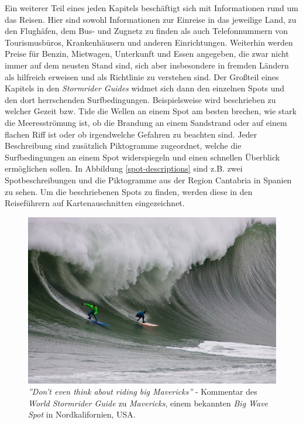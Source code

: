 Ein weiterer Teil eines jeden Kapitels beschäftigt sich mit
Informationen rund um das Reisen. Hier sind sowohl Informationen zur
Einreise in das jeweilige Land, zu den Flughäfen, dem Bus- und Zugnetz
zu finden als auch Telefonnummern von Tourismusbüros, Krankenhäusern
und anderen Einrichtungen. Weiterhin werden Preise für Benzin,
Mietwagen, Unterkunft und Essen angegeben, die zwar nicht immer auf
dem neusten Stand sind, sich aber insbesondere in fremden Ländern als
hilfreich erweisen und als Richtlinie zu verstehen sind. Der Großteil
eines Kapitels in den \textit{Stormrider Guides} widmet sich dann den
einzelnen Spots und den dort herrschenden
Surfbedingungen. Beispielsweise wird beschrieben zu welcher Gezeit
bzw. Tide die Wellen an einem Spot am besten brechen, wie stark die
Meeresströmung ist, ob die Brandung an einem Sandstrand oder auf einem
flachen Riff ist oder ob irgendwelche Gefahren zu beachten sind. Jeder
Beschreibung sind zusätzlich Piktogramme zugeordnet, welche die
Surfbedingungen an einem Spot widerspiegeln und einen schnellen
Überblick ermöglichen sollen. In Abbildung \ref{spot-descriptions}
sind z.B. zwei Spotbeschreibungen und die Piktogramme aus der Region
Cantabria in Spanien zu sehen. Um die beschriebenen Spots zu finden,
werden diese in den Reiseführern auf Kartenauschnitten eingezeichnet.

\begin{figure}[h]
  \includegraphics[width=\textwidth]{bilder/mavericks}
  \caption{\textit{''Don't even think about riding big Mavericks''} -
    Kommentar des \textit{World Stormrider Guide} zu
    \textit{Mavericks}, einem bekannten \textit{Big Wave Spot} in
    Nordkalifornien, USA.}
\end{figure}


